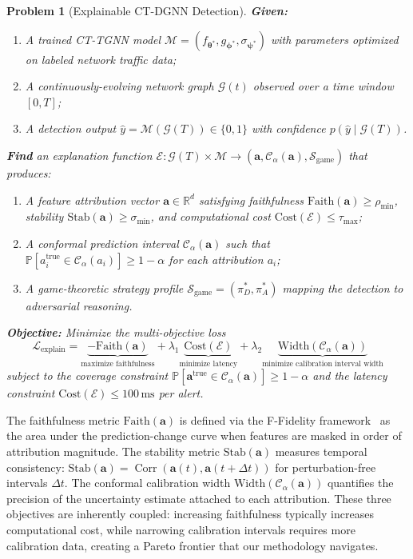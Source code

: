 \documentclass[preprint,review,12pt]{elsarticle}
\newtheorem{problem}{Problem}
\newcommand{\vy}{\hat{y}}               %
\newcommand{\va}{\mathbf{a}}            %
\newcommand{\vtheta}{\boldsymbol{\theta}} %
\newcommand{\vphi}{\boldsymbol{\phi}}     %
\newcommand{\vpsi}{\boldsymbol{\psi}}     %
\newcommand{\R}{\mathbb{R}}
\newcommand{\Prob}{\mathbb{P}}
\newcommand{\calG}{\mathcal{G}}
\newcommand{\calL}{\mathcal{L}}
\newcommand{\calC}{\mathcal{C}}
\newcommand{\calS}{\mathcal{S}}
\newcommand{\calE}{\mathcal{E}}
\newcommand{\calM}{\mathcal{M}}
\DeclareMathOperator{\Corr}{Corr}
\begin{document}
\begin{problem}[Explainable CT-DGNN Detection]\label{prob:explainable}
\textbf{Given:}
\begin{enumerate}
    \item A trained CT-TGNN model $\calM = (f_{\vtheta^*}, g_{\vphi^*}, \sigma_{\vpsi^*})$ with parameters optimized on labeled network traffic data;
    \item A continuously-evolving network graph $\calG(t)$ observed over a time window $[0, T]$;
    \item A detection output $\vy = \calM(\calG(T)) \in \{0,1\}$ with confidence $p(\vy \mid \calG(T))$.
\end{enumerate}
\textbf{Find} an explanation function $\calE: \calG(T) \times \calM \to (\va, \calC_\alpha(\va), \calS_{\mathrm{game}})$ that produces:
\begin{enumerate}
    \item A feature attribution vector $\va \in \R^d$ satisfying faithfulness $\mathrm{Faith}(\va) \geq \rho_{\min}$, stability $\mathrm{Stab}(\va) \geq \sigma_{\min}$, and computational cost $\mathrm{Cost}(\calE) \leq \tau_{\max}$;
    \item A conformal prediction interval $\calC_\alpha(\va)$ such that $\Prob[a_i^{\mathrm{true}} \in \calC_\alpha(a_i)] \geq 1 - \alpha$ for each attribution $a_i$;
    \item A game-theoretic strategy profile $\calS_{\mathrm{game}} = (\pi_D^*, \pi_A^*)$ mapping the detection to adversarial reasoning.
\end{enumerate}
\textbf{Objective:} Minimize the multi-objective loss
\begin{equation}\label{eq:objective_p1}
    \calL_{\mathrm{explain}} = \underbrace{-\mathrm{Faith}(\va)}_{\text{maximize faithfulness}} + \lambda_1 \underbrace{\mathrm{Cost}(\calE)}_{\text{minimize latency}} + \lambda_2 \underbrace{\mathrm{Width}(\calC_\alpha(\va))}_{\text{minimize calibration interval width}}
\end{equation}
subject to the coverage constraint $\Prob[\va^{\mathrm{true}} \in \calC_\alpha(\va)] \geq 1 - \alpha$ and the latency constraint $\mathrm{Cost}(\calE) \leq 100\,\mathrm{ms}$ per alert.
\end{problem}

The faithfulness metric $\mathrm{Faith}(\va)$ is defined via the F-Fidelity framework~\cite{f_fidelity_2024} as the area under the prediction-change curve when features are masked in order of attribution magnitude. The stability metric $\mathrm{Stab}(\va)$ measures temporal consistency: $\mathrm{Stab}(\va) = \Corr(\va(t), \va(t + \Delta t))$ for perturbation-free intervals $\Delta t$. The conformal calibration width $\mathrm{Width}(\calC_\alpha(\va))$ quantifies the precision of the uncertainty estimate attached to each attribution. These three objectives are inherently coupled: increasing faithfulness typically increases computational cost, while narrowing calibration intervals requires more calibration data, creating a Pareto frontier that our methodology navigates.
\end{document}

